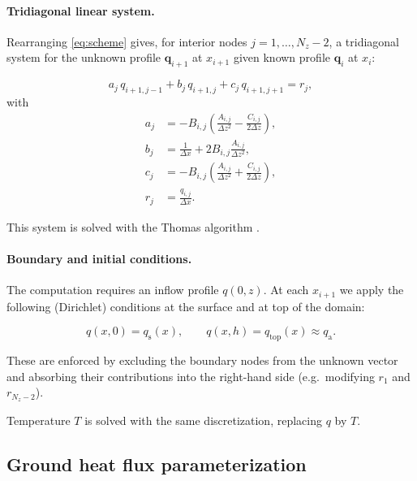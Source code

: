\documentclass{article}
\begin{document}
    \paragraph{Tridiagonal linear system.}
    
    Rearranging \eqref{eq:scheme} gives, for interior nodes $j=1,\ldots,N_z-2$,
    a tridiagonal system for the unknown profile $\mathbf{q}_{i+1}$ at $x_{i+1}$ given known profile 
    $\mathbf{q}_{i}$ at $x_{i}$:
    
    \begin{equation}
    a_j\,q_{i+1,j-1} + b_j\,q_{i+1,j} + c_j\,q_{i+1,j+1} = r_j,
    \end{equation}
    with
    \begin{align}
    a_j &= -B_{i,j}\left(\frac{A_{i,j}}{\Delta z^2} - \frac{C_{i,j}}{2\Delta z}\right),\\
    b_j &= \frac{1}{\Delta x} + 2B_{i,j}\frac{A_{i,j}}{\Delta z^2},\\
    c_j &= -B_{i,j}\left(\frac{A_{i,j}}{\Delta z^2} + \frac{C_{i,j}}{2\Delta z}\right),\\
    r_j &= \frac{q_{i,j}}{\Delta x}.
    \end{align}
    
    This system is solved with the Thomas algorithm \cite{press2007numerical}.
    
    \paragraph{Boundary and initial conditions.}
    
    The computation requires an inflow profile $q(0,z)$.
    At each $x_{i+1}$ we apply the following (Dirichlet) conditions at the surface and at top of the domain:
    
    \begin{equation}
    q(x,0)=q_{\mathrm{s}}(x),
    \qquad
    q(x,h)=q_{\mathrm{top}}(x)\approx q_{\mathrm{a}}.
    \end{equation}
    
    These are enforced by excluding the boundary nodes from the unknown vector and
    absorbing their contributions into the right-hand side (e.g.\ modifying $r_1$ and $r_{N_z-2}$).
    
    Temperature $T$ is solved with the same discretization, replacing $q$  by $T$.
    
    \subsection*{Ground heat flux parameterization }
    
\end{document}
